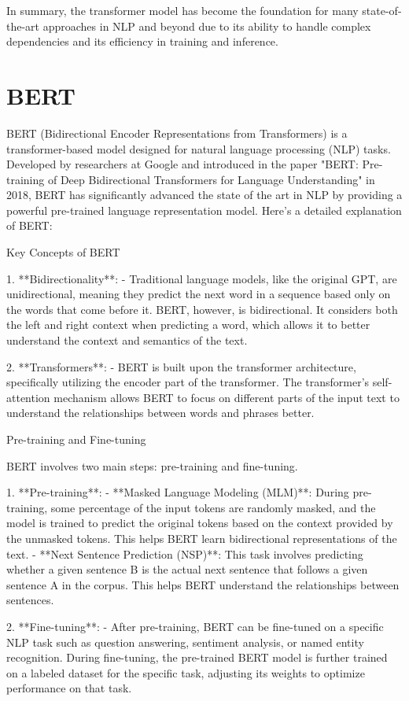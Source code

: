 In summary, the transformer model has become the foundation for many state-of-the-art approaches in NLP and beyond due to its ability to handle complex dependencies and its efficiency in training and inference.

\section{BERT}
BERT (Bidirectional Encoder Representations from Transformers) is a transformer-based model designed for natural language processing (NLP) tasks. Developed by researchers at Google and introduced in the paper "BERT: Pre-training of Deep Bidirectional Transformers for Language Understanding" in 2018, BERT has significantly advanced the state of the art in NLP by providing a powerful pre-trained language representation model. Here's a detailed explanation of BERT:

 Key Concepts of BERT

1. **Bidirectionality**:
   - Traditional language models, like the original GPT, are unidirectional, meaning they predict the next word in a sequence based only on the words that come before it. BERT, however, is bidirectional. It considers both the left and right context when predicting a word, which allows it to better understand the context and semantics of the text.

2. **Transformers**:
   - BERT is built upon the transformer architecture, specifically utilizing the encoder part of the transformer. The transformer’s self-attention mechanism allows BERT to focus on different parts of the input text to understand the relationships between words and phrases better.

 Pre-training and Fine-tuning

BERT involves two main steps: pre-training and fine-tuning.

1. **Pre-training**:
   - **Masked Language Modeling (MLM)**: During pre-training, some percentage of the input tokens are randomly masked, and the model is trained to predict the original tokens based on the context provided by the unmasked tokens. This helps BERT learn bidirectional representations of the text.
   - **Next Sentence Prediction (NSP)**: This task involves predicting whether a given sentence B is the actual next sentence that follows a given sentence A in the corpus. This helps BERT understand the relationships between sentences.

2. **Fine-tuning**:
   - After pre-training, BERT can be fine-tuned on a specific NLP task such as question answering, sentiment analysis, or named entity recognition. During fine-tuning, the pre-trained BERT model is further trained on a labeled dataset for the specific task, adjusting its weights to optimize performance on that task.

